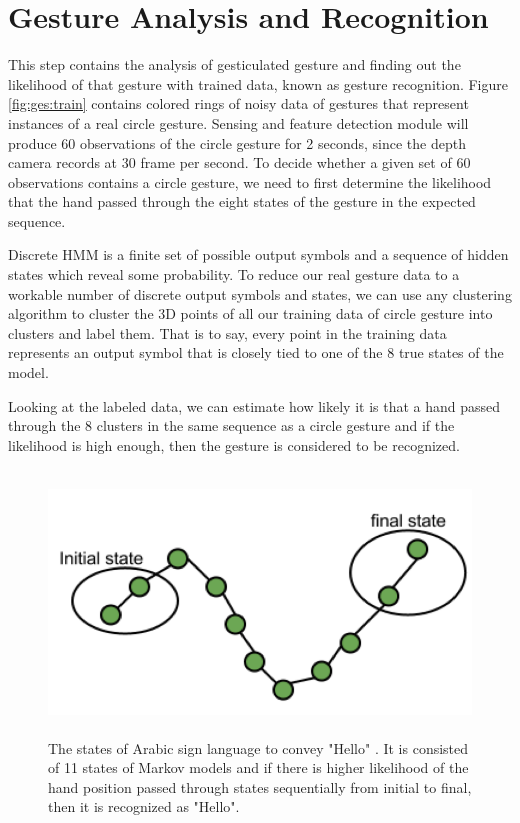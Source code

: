 \section{Gesture Analysis and Recognition}
This step contains the analysis of gesticulated gesture and finding out the likelihood of that gesture with trained data, known as gesture recognition. Figure \ref{fig:ges:train}  contains colored rings of noisy data of gestures that represent instances of a real circle gesture. Sensing and feature detection module will produce 60 observations of the circle gesture for 2 seconds, since the depth camera records at 30 frame per second. To decide whether a given set of 60 observations contains a circle gesture, we need to first determine the likelihood that the hand passed through the eight states of the gesture in the expected sequence.

Discrete HMM is a finite set of possible output symbols and a sequence of hidden states which reveal some probability. To reduce our real gesture data to a workable number of discrete output symbols and states, we can use any clustering algorithm to cluster the 3D points of all our training data of circle gesture into clusters and label them. That is to say, every point in the training data represents an output symbol that is closely tied to one of the 8 true states of the model.

Looking at the labeled data, we can estimate how likely it is that a hand passed through the 8 clusters in the same sequence as a circle gesture and if the likelihood is high enough, then the gesture is considered to be recognized.

\begin{figure}
	[h] \centering 
	\includegraphics[height=7cm]{figures/ges-rec.png} \caption{The states of Arabic sign language to convey "Hello" \cite{11}. It is consisted of 11 states of Markov models and if there is higher likelihood of the hand position passed through states sequentially from initial to final, then it is recognized as "Hello".} \label{fig:ges:reg} 
\end{figure}

